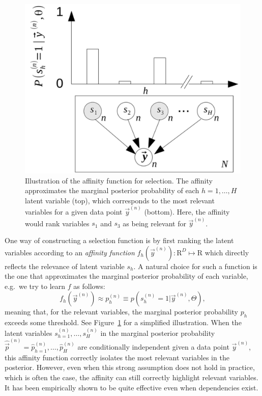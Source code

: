 \begin{figure}[h]
\begin{center}
\includegraphics[width=.35\textwidth]{figs/graph-affinity.pdf}
\caption{Illustration of the affinity function for selection.
The affinity approximates the marginal posterior probability of each $h=1,\dots,H$ latent variable (top), 
which corresponds to the most relevant variables for a given data point $\vec{y}^{(n)}$ (bottom). 
Here, the affinity would rank variables $s_1$ and $s_3$ as being relevant for $\vec{y}^{(n)}$.
}\label{fig:graph-affinity}
\end{center}
\end{figure}
%
One way of constructing a selection function %
is by first ranking the latent variables according to an 
\emph{affinity function} $f_h(\vec{y}^{(n)}) : \mathrm{R}^D \mapsto \mathrm{R}$ %
which directly reflects the relevance of latent variable $s_h$. 
%
A natural choice for such a function is the one that approximates the marginal posterior probability 
of each variable, e.g.\ we try to learn $f$ as follows:
%
\begin{equation}
\label{eq:affinity}
f_h(\vec{y}^{(n)}) \approx p^{(n)}_h \equiv p(s^{(n)}_h = 1|\vec{y}^{(n)}, \Theta),
\end{equation}
%
meaning that, for the relevant variables, the marginal posterior probability $p_h$ 
exceeds some threshold. %
See Figure~\ref{fig:graph-affinity} for a simplified illustration. 
%
When the latent variables $s_{h=1}^{(n)}, \dots, s_H^{(n)}$ in the marginal posterior probability $\hat{\vec{p}}^{(n)} = \hat{p}_{h=1}^{(n)},\dots, \hat{p}_H^{(n)}$ are conditionally independent given a data point $\vec{y}^{(n)}$, this affinity function correctly isolates the most relevant variables in the posterior.
%
However, even when this strong assumption does not hold in practice, which is often the case, 
the affinity can still correctly highlight relevant variables.
It has been empirically shown to be quite effective even when dependencies exist.


